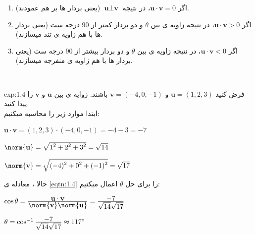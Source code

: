 {\begin{spacing}{1.5}
        \begin{enumerate}[label=\textbf{\arabic*}.]
            \item {اگر $\textbf{u}\cdot\textbf{v}=0$، در نتیجه $\textbf{u}\perp\textbf{v}$ (یعنی بردار ها بر هم عمودند).}
            \item {اگر $\textbf{u}\cdot\textbf{v}>0$، در نتیجه زاویه ی بین $\theta$ و دو بردار کمتر از 90 درجه ست (یعنی بردار ها با هم زاویه ی تند میسازند).}
            \item {اگر $\textbf{u}\cdot\textbf{v}<0$، در نتیجه زاویه ی بین $\theta$ و دو بردار بیشتر از 90 درجه ست (یعنی بردار ها با هم زاویه ی منفرجه میسازند).}
        \end{enumerate} \\

        \begin{example}{exp:1.4}
            فرض کنید $\textbf{u}=(1,2,3)$ و $\textbf{v}=(-4,0,-1)$ باشند. زوایه ی بین $\textbf{u}$ و $\textbf{v}$ را پیدا کنید. \\
            ابتدا موارد زیر را محاسبه میکنیم:

            \begin{center}
                $\textbf{u}\cdot\textbf{v}=(1,2,3)\cdot(-4,0,-1)=-4-3=-7$

                $\norm{\textbf{u}}=\sqrt{\displaystyle 1^2+2^2+3^2}=\sqrt{\displaystyle 14}$

                $\norm{\textbf{v}}=\sqrt{\displaystyle (-4)^2+0^2+(-1)^2}=\sqrt{\displaystyle 17}$
            \end{center}

            حالا ، معادله ی \ref{eqtn:1.4} را برای حل $\theta$ اعمال میکنیم:

            \begin{center}
                $\cos\theta=\frac{\displaystyle\textbf{u}\cdot\textbf{v}}{\displaystyle\norm{\textbf{v}}\norm{\textbf{u}}}=\frac{\displaystyle -7}{\displaystyle \sqrt{\displaystyle 14}\sqrt{\displaystyle 17}}$

                $\theta=\cos^{-1}\frac{\displaystyle -7}{\displaystyle \sqrt{\displaystyle 14}\sqrt{\displaystyle 17}}\thickapprox 117^\circ$
            \end{center}
        \end{example}


\end{spacing}}
